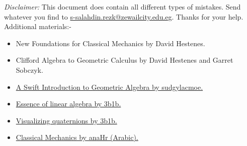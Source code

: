\noindent \textit{Disclaimer:}
This document does contain all different types of mistakes.
Send whatever you find to
\href{mailto:s-salahdin.rezk@zewailcity.edu.eg}{s-salahdin.rezk@zewailcity.edu.eg}.
Thanks for your help.\\

Additional materials:-
\begin{itemize}
    \item New Foundations for Classical Mechanics by David Hestenes.
    \item Clifford Algebra to Geometric Calculus by David Hestenes and Garret Sobczyk.
    \item \href{https://www.youtube.com/watch?v=60z_hpEAtD8}{
A Swift Introduction to Geometric Algebra by sudgylacmoe.}
    \item \href{https://www.youtube.com/playlist?list=PLZHQObOWTQDPD3MizzM2xVFitgF8hE_ab}{Essence of linear algebra by 3b1b.}
    \item \href{https://www.youtube.com/watch?v=d4EgbgTm0Bg}{Visualizing quaternions by 3b1b.}
    \item \href{https://www.youtube.com/playlist?list=PL8pYI62gCNsXyl6qNmOBlYdVQy6RLNItO}{Classical Mechanics by anaHr (Arabic).}
\end{itemize}
